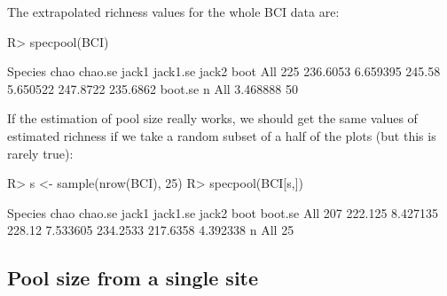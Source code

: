 \documentclass[article,nojss]{jss}
\begin{document}
The extrapolated richness values for the whole BCI data are:
\begin{Schunk}
\begin{Sinput}
R> specpool(BCI)
\end{Sinput}
\begin{Soutput}
    Species     chao  chao.se  jack1 jack1.se    jack2     boot
All     225 236.6053 6.659395 245.58 5.650522 247.8722 235.6862
     boot.se  n
All 3.468888 50
\end{Soutput}
\end{Schunk}
If the estimation of pool size really works, we should get the same
values of estimated richness if we take a random subset of a half of
the plots (but this is rarely true):
\begin{Schunk}
\begin{Sinput}
R> s <- sample(nrow(BCI), 25)
R> specpool(BCI[s,])
\end{Sinput}
\begin{Soutput}
    Species    chao  chao.se  jack1 jack1.se    jack2     boot  boot.se
All     207 222.125 8.427135 228.12 7.533605 234.2533 217.6358 4.392338
     n
All 25
\end{Soutput}
\end{Schunk}

\subsection{Pool size from a single site}
\end{document}
